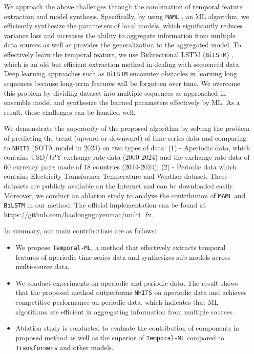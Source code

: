 \documentclass[a4paper,fleqn]{cas-sc}
\begin{document}
We approach the above challenges through the combination of temporal feature extraction and model synthesis. Specifically, by using \verb|MAML| \cite{finn2017model}, an ML algorithm, we efficiently synthesize the parameters of local models, which significantly reduces variance loss and increases the ability to aggregate information from multiple data sources as well as provides the generalization to the aggregated model. To effectively learn the temporal feature, we use Bidirectional LSTM (\verb|BiLSTM|) \cite{cui2018deep}, which is an old but efficient extraction method in dealing with sequenced data. Deep learning approaches such as \verb|BiLSTM| encounter obstacles in learning long sequences because long-term features will be forgotten over time. We overcome this problem by dividing dataset into multiple sequences as approached in ensemble model and synthesize the learned parameters effectively by ML. As a result, these challenges can be handled well.

\vspace{1mm}

We demonstrate the superiority of the proposed algorithm by solving the problem of predicting the trend (upward or downward) of time-series data and comparing to \verb|NHITS| \cite{challu2023nhits} (SOTA model in 2023) on two types of data: (1) - Aperiodic data, which contains USD/JPY exchange rate data (2000-2024) and the exchange rate data of 60 currency pairs made of 18 countries (2014-2024); (2) - Periodic data which contains Electricity Transformer Temperature \cite{zhou2021informer} and Weather \cite{Kolle} dataset. These datasets are publicly available on the Internet and can be downloaded easily. Moreover, we conduct an ablation study to analyze the contribution of \verb|MAML| and \verb|BiLSTM| in our method. The official implementation can be found at \url{https://github.com/baolongnguyenmac/multi_fx}.

\vspace{1mm}

In summary, our main contributions are as follows:

\begin{itemize}
    \item We propose \verb|Temporal-ML|, a method that effectively extracts temporal features of aperiodic time-series data and synthesizes sub-models across multi-source data.
    \item We conduct experiments on aperiodic and periodic data. The result shows that the proposed method outperforms \verb|NHITS| on aperiodic data and achieves competitive performance on periodic data, which indicates that ML algorithms are efficient in aggregating information from multiple sources.
    \item Ablation study is conducted to evaluate the contribution of components in proposed method as well as the superior of \verb|Temporal-ML| compared to \verb|Transformers| and other models.
\end{itemize}
\end{document}
